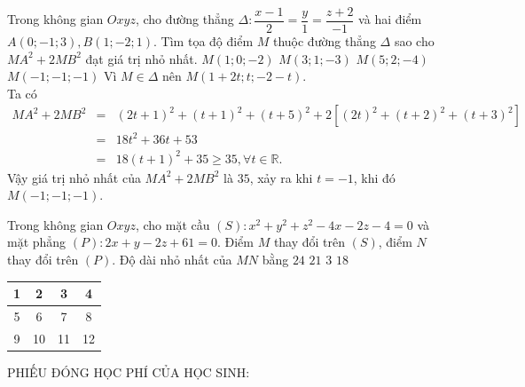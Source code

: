 	\begin{ex}%
	Trong không gian $Oxyz$, cho đường thẳng $\Delta \colon \dfrac{x-1}{2}=\dfrac{y}{1}=\dfrac{z+2}{-1}$ và hai điểm $A(0;-1;3), B(1;-2;1)$. Tìm tọa độ điểm $M$ thuộc đường thẳng $\Delta$ sao cho $MA^2+2MB^2$ đạt giá trị nhỏ nhất.
	\choice
	{$M(1;0;-2)$}
	{$M(3;1;-3)$}
	{$M(5;2;-4)$}
	{\True $M(-1;-1;-1)$}
	\loigiai
	{ Vì $M \in \Delta$ nên $M\left( 1+2t;t;-2-t\right)$.\\
	Ta có 
	\begin{eqnarray*}
	MA^2+2MB^2&=&(2t+1)^2+(t+1)^2+(t+5)^2 +2 \left[ (2t)^2+ (t+2)^2 +(t+3)^2\right]\\
	&= & 18t^2 +36t +53\\
	&= & 18(t+1)^2+35 \geq 35, \forall t \in \mathbb{R}.
	\end{eqnarray*}
	Vậy giá trị nhỏ nhất của $MA^2+2MB^2$ là $35$, xảy ra khi $t=-1$, khi đó $M(-1;-1;-1)$.
	}
	\end{ex}
	\begin{ex}%
	Trong không gian $Oxyz$, cho mặt cầu $(S)\colon x^2+y^2+z^2-4x-2z-4=0$ và mặt phẳng $(P)\colon 2x+y-2z+61=0$. Điểm $M$ thay đổi trên $(S)$, điểm $N$ thay đổi trên $(P)$. Độ dài nhỏ nhất của $MN$ bằng
	\choice
	{$24$}
	{$21$}
	{$3$}
	{\True $18$}
	\end{ex}

\begin{center}
	\begin{tabular}{|c|c|c|c|}
		\hline 
		1 & 2 & 3&4 \\ \hline
		5 & 6 & 7&8 \\ \hline
		9 & 10 & 11&12 \\ \hline
	\end{tabular}
	\begin{center}
		PHIẾU ĐÓNG HỌC PHÍ CỦA HỌC SINH: 
	\end{center}
\end{center}
